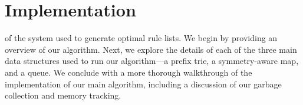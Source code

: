 \chapter{Implementation}





 of the system used to generate optimal rule lists.
We begin by providing an overview of our algorithm.
Next, we explore the details of each of the three main data structures used to run our algorithm---a prefix trie, a symmetry-aware map, and a queue. 
We conclude with a more thorough walkthrough of the implementation of our main algorithm, including a discussion of our garbage collection and memory tracking.

